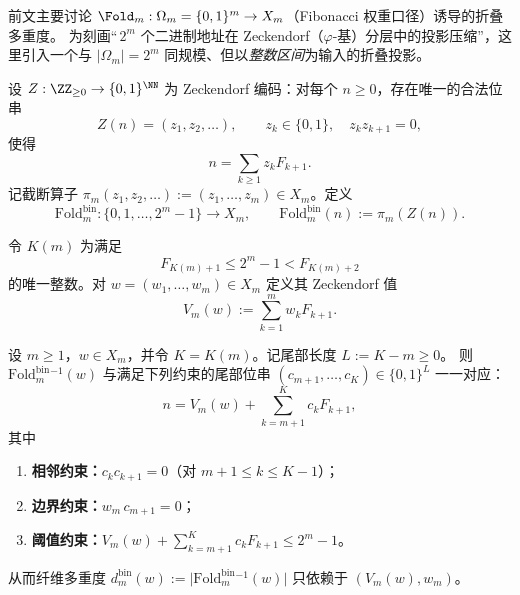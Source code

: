 前文主要讨论 \(\Fold_m:\Omega_m=\{0,1\}^m\to X_m\)（Fibonacci 权重口径）诱导的折叠多重度。
为刻画“\(\,2^m\) 个二进制地址在 Zeckendorf（\(\varphi\)-基）分层中的投影压缩”，这里引入一个与 \(|\Omega_m|=2^m\) 同规模、但以\emph{整数区间}为输入的折叠投影。

\begin{definition}\label{def:fold-bin}
设 \(Z:\ZZ_{\ge 0}\to\{0,1\}^{\NN}\) 为 Zeckendorf 编码：对每个 \(n\ge 0\)，存在唯一的合法位串
\[
Z(n)=(z_1,z_2,\dots),\qquad z_k\in\{0,1\},\quad z_k z_{k+1}=0,
\]
使得
\[
n=\sum_{k\ge 1} z_k F_{k+1}.
\]
记截断算子 \(\pi_m(z_1,z_2,\dots):=(z_1,\dots,z_m)\in X_m\)。定义
\[
\mathrm{Fold}^{\mathrm{bin}}_m:\{0,1,\dots,2^m-1\}\to X_m,\qquad
\mathrm{Fold}^{\mathrm{bin}}_m(n):=\pi_m(Z(n)).
\]
\end{definition}

\begin{definition}[\(K(m)\) 与 Zeckendorf 值]\label{def:K-of-m}
令 \(K(m)\) 为满足
\begin{equation}\label{eq:K-of-m}
F_{K(m)+1}\le 2^m-1 < F_{K(m)+2}
\end{equation}
的唯一整数。对 \(w=(w_1,\dots,w_m)\in X_m\) 定义其 Zeckendorf 值
\[
V_m(w):=\sum_{k=1}^m w_k F_{k+1}.
\]
\end{definition}

\begin{proposition}[纤维的尾部表示]\label{prop:fold-bin-fiber-tail}
设 \(m\ge 1\)，\(w\in X_m\)，并令 \(K=K(m)\)。记尾部长度 \(L:=K-m\ge 0\)。
则 \(\mathrm{Fold}^{\mathrm{bin}}_m{}^{-1}(w)\) 与满足下列约束的尾部位串 \((c_{m+1},\dots,c_K)\in\{0,1\}^{L}\) 一一对应：
\[
n
=V_m(w)+\sum_{k=m+1}^{K} c_k F_{k+1},
\]
其中
\begin{enumerate}
  \item \textbf{相邻约束：}\quad \(c_k c_{k+1}=0\)（对 \(m+1\le k\le K-1\)）；
  \item \textbf{边界约束：}\quad \(w_m\,c_{m+1}=0\)；
  \item \textbf{阈值约束：}\quad \(V_m(w)+\sum_{k=m+1}^{K} c_k F_{k+1}\le 2^m-1\)。
\end{enumerate}
从而纤维多重度
\(
d^{\mathrm{bin}}_m(w):=\bigl|\mathrm{Fold}^{\mathrm{bin}}_m{}^{-1}(w)\bigr|
\)
只依赖于 \((V_m(w),w_m)\)。
\end{proposition}

